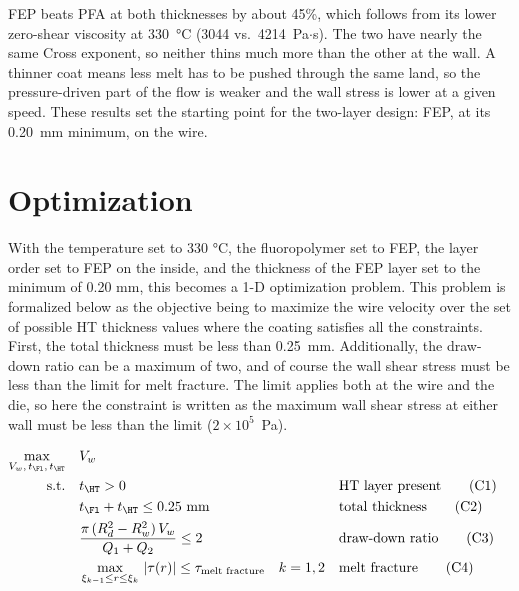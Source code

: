 \documentclass[11pt]{article}
\begin{document}
FEP beats PFA at both thicknesses by about 45\%, which follows from its lower zero-shear viscosity at 330~°C (3044 vs.\ 4214~Pa$\cdot$s). The two have nearly the same Cross exponent, so neither thins much more than the other at the wall. A thinner coat means less melt has to be pushed through the same land, so the pressure-driven part of the flow is weaker and the wall stress is lower at a given speed. These results set the starting point for the two-layer design: FEP, at its 0.20~mm minimum, on the wire.


\section*{Optimization}

With the temperature set to 330 °C, the fluoropolymer set to FEP, the layer order set to FEP on the inside, and the thickness of the FEP layer set to the minimum of 0.20 mm, this becomes a 1-D optimization problem. This problem is formalized below as the objective being to maximize the wire velocity over the set of possible HT thickness values where the coating satisfies all the constraints. First, the total thickness must be less than 0.25~mm. Additionally, the draw-down ratio can be a maximum of two, and of course the wall shear stress must be less than the limit for melt fracture. The limit applies both at the wire and the die, so here the constraint is written as the maximum wall shear stress at either wall must be less than the limit ($2\times 10^5$~Pa).



\begin{align*}
\max_{V_w,\,t_{\Fl},\,t_{\HT}}\quad & V_w \\
\text{s.t.}\quad
& t_{\HT} > 0 && \text{HT layer present} \tag{C1}\\
& t_{\Fl}+t_{\HT} \le 0.25\ \mathrm{mm} && \text{total thickness} \tag{C2}\\
& \dfrac{\pi\,(R_d^2-R_w^2)\,V_w}{Q_1+Q_2} \le 2 && \text{draw-down ratio} \tag{C3}\\
& \max_{\xi_{k-1}\le r\le\xi_k}\,|\tau(r)| \le \tau_{\text{melt fracture}} \quad k=1,2 && \text{melt fracture} \tag{C4}\\
\end{align*}
\end{document}
